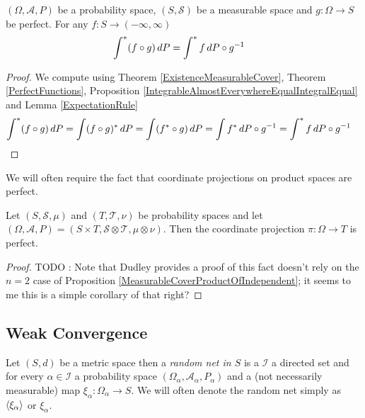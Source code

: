 \begin{cor}\label{cor:OuterExpectationRule}$(\Omega, \mathcal{A}, P)$ be a probability space, $(S, \mathcal{S})$ be a measurable space and $g : \Omega \to S$ be perfect.  For any $f : S \to (-\infty, \infty)$
\begin{align*}
\int^* (f \circ g) \, dP &= \int^* f \, d\pushforward{g}{P}
\end{align*}
\end{cor}
\begin{proof}
We compute using Theorem \ref{ExistenceMeasurableCover}, Theorem \ref{PerfectFunctions}, Proposition \ref{IntegrableAlmostEverywhereEqualIntegralEqual} and Lemma \ref{ExpectationRule}
\begin{align*}
\int^* (f \circ g) \, dP &= \int (f \circ g)^* \, dP = \int (f^* \circ g) \, dP = \int f^* \, d\pushforward{g}{P} = \int^* f  \, d\pushforward{g}{P}
\end{align*}
\end{proof}

We will often require the fact that coordinate projections on product spaces are perfect.
\begin{prop}\label{prop:CoordinateProjectionsArePerfect}Let $(S, \mathcal{S}, \mu)$ and $(T, \mathcal{T}, \nu)$ be probability spaces and let $(\Omega, \mathcal{A}, P) = (S\times T, \mathcal{S}\otimes \mathcal{T}, \mu \otimes \nu)$.  Then the coordinate projection $\pi : \Omega \to T$ is perfect.
\end{prop}
\begin{proof}
TODO : Note that Dudley provides a proof of this fact doesn't rely on the $n=2$ case of Proposition \ref{MeasurableCoverProductOfIndependent}; it seems to me this is a simple corollary of that right?
\end{proof}

\subsection{Weak Convergence}

\begin{defn}Let $(S,d)$ be a metric space then a \emph{random net in $S$} is a $\mathcal{I}$ a directed set and for every $\alpha \in \mathcal{I}$ a probability space $(\Omega_\alpha, \mathcal{A}_\alpha, P_\alpha)$ and a (not necessarily measurable) map $\xi_\alpha : \Omega_\alpha \to S$.  We will often denote the random net simply as $\net{\xi}{\alpha}$ or $\xi_\alpha$.
\end{defn}

